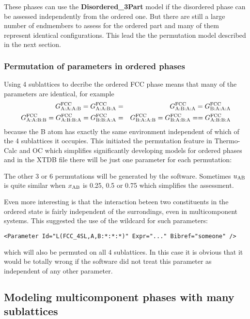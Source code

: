 \documentclass{article}
\begin{document}
\begin{appendices}
These phases can use the {\bf Disordered\_3Part} model if the
disordered phase can be assessed independently from the ordered one.
But there are still a large number of endmembers to assess for the
ordered part and many of them represent identical configurations.
This lead the the permutation model described in the next section.

\subsubsection{Permutation of parameters in ordered phases}\label{sec:permut}

Using 4 sublattices to decribe the ordered FCC phase means that
many of the parameters are identical, for example
\begin{eqnarray}
G^{\rm FCC}_{\rm A:A:A:B} = G^{\rm FCC}_{\rm A:A:B:A} &=& G^{\rm FCC}_{\rm A:B:A:A} = G^{\rm FCC}_{\rm B:A:A:A} \label{eq:gl12}\\
G^{\rm FCC}_{\rm A:A:B:B} = G^{\rm FCC}_{\rm A:B:B:A} = G^{\rm FCC}_{\rm B:B:A:A} &=& G^{\rm FCC}_{\rm B:A:A:B} = G^{\rm FCC}_{\rm B:A:B:A} = = G^{\rm FCC}_{\rm A:B:B:A}  \label{eq:gl10}
\end{eqnarray}
because the B atom has exactly the same environment independent of
which of the 4 sublattices it occupies.  This initiated the
permutation feature in Thermo-Calc and OC which simplifies
significantly developing models for ordered phases and in the XTDB
file there will be just one parameter for each permutation:

The other 3 or 6 permutations will be generated by the software.
Sometimes $u_{\rm AB}$ is quite similar when $x_{\rm AB}$ is 0.25, 0.5
or 0.75 which simplifies the assessment.

Even more interesting is that the interaction beteen two constituents
in the ordered state is fairly independent of the surrondings, even in
multicomponent systems.  This suggested the use of the wildcard for
such parameters:

\begin{verbatim}
<Parameter Id="L(FCC_4SL,A,B:*:*:*)" Expr="..." Bibref="someone" />
\end{verbatim}

\noindent
which will also be permuted on all 4 sublattices.  In this case it is
obvious that it would be totally wrong if the software did not treat
this parameter as independent of any other parameter.

\subsection{Modeling multicomponent phases with many sublattices}


\end{appendices}
\end{document}
